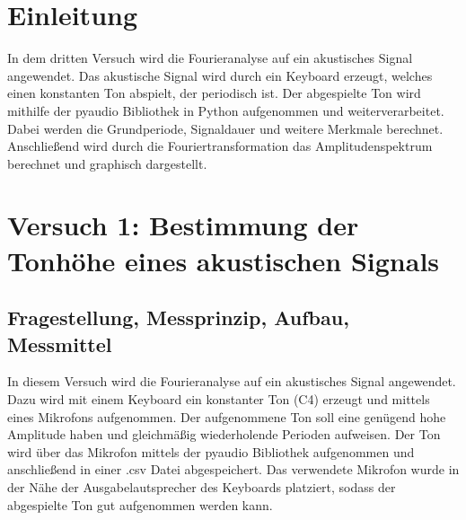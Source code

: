 \documentclass[12pt, oneside, a4paper, \docLanguage]{report}
\begin{document}

\setcounter{section}{0}



\clearpage

%
%


%
%


%
%


%
%




\setcounter{page}{1}
\pagestyle{default}
%
%
\chapter{Einleitung}
\label{chap:EINL}

In dem dritten Versuch wird die Fourieranalyse auf ein akustisches Signal angewendet. Das akustische Signal wird durch ein Keyboard erzeugt, welches einen konstanten Ton abspielt, der periodisch ist. Der abgespielte Ton wird mithilfe der pyaudio Bibliothek in Python aufgenommen und weiterverarbeitet. Dabei werden die Grundperiode, Signaldauer und weitere Merkmale berechnet. Anschließend wird durch die Fouriertransformation das Amplitudenspektrum berechnet und graphisch dargestellt.

%
%
\chapter{Versuch 1: Bestimmung der Tonhöhe eines akustischen Signals}
\label{chap:VERSUCH_1}

\section{Fragestellung, Messprinzip, Aufbau, Messmittel}
\label{chap:VERSUCH_1_FRAGESTELLUNG}

In diesem Versuch wird die Fourieranalyse auf ein akustisches Signal angewendet. Dazu wird mit einem Keyboard ein konstanter Ton (C4) erzeugt und mittels eines Mikrofons aufgenommen. Der aufgenommene Ton soll eine genügend hohe Amplitude haben und gleichmäßig wiederholende Perioden aufweisen. Der Ton wird über das Mikrofon mittels der pyaudio Bibliothek aufgenommen und anschließend in einer .csv Datei abgespeichert.
Das verwendete Mikrofon wurde in der Nähe der Ausgabelautsprecher des Keyboards platziert, sodass der abgespielte Ton gut aufgenommen werden kann.
\end{document}
